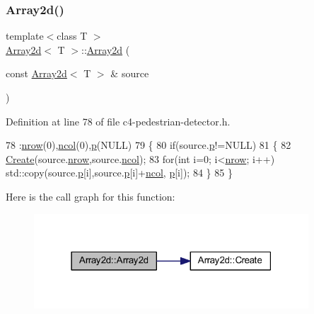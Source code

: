 \subsubsection{\texorpdfstring{Array2d()}{Array2d()}\hspace{0.1cm}{\footnotesize\ttfamily [3/3]}}
{\footnotesize\ttfamily template$<$class T $>$ \\
\mbox{\hyperlink{class_array2d}{Array2d}}$<$ T $>$\+::\mbox{\hyperlink{class_array2d}{Array2d}} (\begin{DoxyParamCaption}\item[{const \mbox{\hyperlink{class_array2d}{Array2d}}$<$ T $>$ \&}]{source }\end{DoxyParamCaption})}



Definition at line 78 of file c4-\/pedestrian-\/detector.\+h.


\begin{DoxyCode}
78                                            :\mbox{\hyperlink{class_array2d_a373dd63664bee40ef720d183d03e5bdb}{nrow}}(0),\mbox{\hyperlink{class_array2d_afe48cd05774cae5b6872324ae49e089b}{ncol}}(0),\mbox{\hyperlink{class_array2d_ac7b70bc423364c43c7c174cdde515380}{p}}(NULL)
79 \{
80     \textcolor{keywordflow}{if}(source.\mbox{\hyperlink{class_array2d_ac7b70bc423364c43c7c174cdde515380}{p}}!=NULL)
81     \{
82         \mbox{\hyperlink{class_array2d_af1d2cec0973cedfe74ae5b967532922f}{Create}}(source.\mbox{\hyperlink{class_array2d_a373dd63664bee40ef720d183d03e5bdb}{nrow}},source.\mbox{\hyperlink{class_array2d_afe48cd05774cae5b6872324ae49e089b}{ncol}});
83         \textcolor{keywordflow}{for}(\textcolor{keywordtype}{int} i=0; i<\mbox{\hyperlink{class_array2d_a373dd63664bee40ef720d183d03e5bdb}{nrow}}; i++) std::copy(source.\mbox{\hyperlink{class_array2d_ac7b70bc423364c43c7c174cdde515380}{p}}[i],source.\mbox{\hyperlink{class_array2d_ac7b70bc423364c43c7c174cdde515380}{p}}[i]+\mbox{\hyperlink{class_array2d_afe48cd05774cae5b6872324ae49e089b}{ncol}},
      \mbox{\hyperlink{class_array2d_ac7b70bc423364c43c7c174cdde515380}{p}}[i]);
84     \}
85 \}
\end{DoxyCode}
Here is the call graph for this function\+:\nopagebreak
\begin{figure}[H]
\begin{center}
\leavevmode
\includegraphics[width=291pt]{class_array2d_ad3b3759e78a6840cce7b8009fe960621_cgraph}
\end{center}
\end{figure}
\mbox{\label{class_array2d_afe31cffbc2b8bc84153ec3ad7e40a0e2}} 
